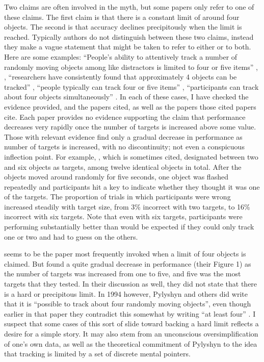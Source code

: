 \documentclass[
]{book}
\begin{document}
Two claims are often involved in the myth, but some papers only refer to one of these claims. The first claim is that there is a constant limit of around four objects. The second is that accuracy declines precipitously when the limit is reached. Typically authors do not distinguish between these two claims, instead they make a vague statement that might be taken to refer to either or to both. Here are some examples:
``People's ability to attentively track a number of randomly moving objects among like distractors is limited to four or five items'' \citep{fougnieDistinctCapacityLimits2006}, , ``researchers have consistently found that approximately 4 objects can be tracked'' \citet{alvarezHowManyObjects2007}, ``people typically can track four or five items'' \citet{chesneyEvidenceSharedMechanism2011} , ``participants can track about four objects simultaneously'' \citet{vanderburgChangesNotDifferences2019} . In each of these cases, I have checked the evidence provided, and the papers cited, as well as the papers those cited papers cite. Each paper provides no evidence supporting the claim that performance decreases very rapidly once the number of targets is increased above some value. Those with relevant evidence find only a gradual decrease in performance as number of targets is increased, with no discontinuity; not even a conspicuous inflection point. For example, \citet{oksamaMultipleObjectTracking2004}, which is sometimes cited, designated between two and six objects as targets, among twelve identical objects in total. After the objects moved around randomly for five seconds, one object was flashed repeatedly and participants hit a key to indicate whether they thought it was one of the targets. The proportion of trials in which participants were wrong increased steadily with target size, from 3\% incorrect with two targets, to 16\% incorrect with six targets. Note that even with six targets, participants were performing substantially better than would be expected if they could only track one or two and had to guess on the others.

\citet{pylyshynTrackingMultipleIndependent1988} seems to be the paper most frequently invoked when a limit of four objects is claimed. But \citet{pylyshynTrackingMultipleIndependent1988} found a quite gradual decrease in performance (their Figure 1) as the number of targets was increased from one to five, and five was the most targets that they tested. In their discussion as well, they did not state that there is a hard or precipitous limit. In 1994 however, Pylyshyn and others did write that it is ``possible to track about four randomly moving objects'', even though earlier in that paper they contradict this somewhat by writing ``at least four'' \citep{pylyshynMultipleParallelAccess1994}. I suspect that some cases of this sort of slide toward backing a hard limit reflects a desire for a simple story. It may also stem from an unconscious oversimplification of one's own data, as well as the theoretical commitment of Pylyshyn to the idea that tracking is limited by a set of discrete mental pointers.
\end{document}
